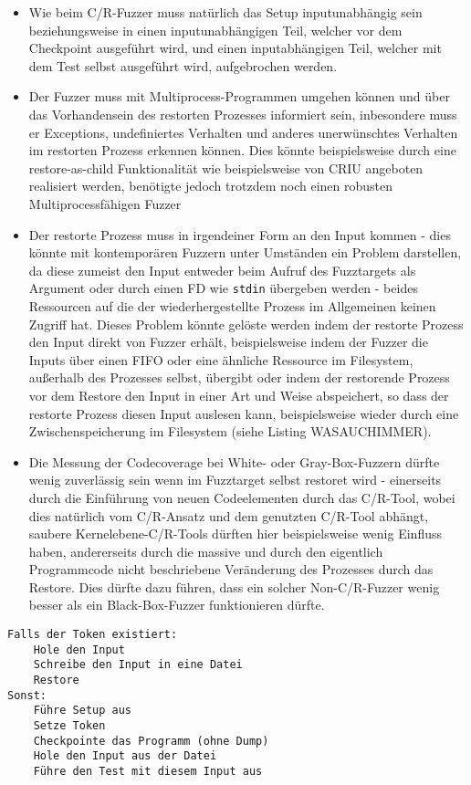 \documentclass[a4paper]{article}
\begin{document}
\begin{itemize}
    \item Wie beim C/R-Fuzzer muss natürlich das Setup inputunabhängig sein beziehungsweise in einen inputunabhängigen Teil, welcher vor dem Checkpoint ausgeführt wird, und einen inputabhängigen Teil, welcher mit dem Test selbst ausgeführt wird, aufgebrochen werden.
    \item Der Fuzzer muss mit Multiprocess-Programmen umgehen können und über das Vorhandensein des restorten Prozesses informiert sein, inbesondere muss er Exceptions, undefiniertes Verhalten und anderes unerwünschtes Verhalten im restorten Prozess erkennen können. Dies könnte beispielsweise durch eine restore-as-child Funktionalität wie beispielsweise von CRIU angeboten realisiert werden, benötigte jedoch trotzdem noch einen robusten Multiprocessfähigen Fuzzer
    \item Der restorte Prozess muss in irgendeiner Form an den Input kommen - dies könnte mit kontemporären Fuzzern unter Umständen ein Problem darstellen, da diese zumeist den Input entweder beim Aufruf des Fuzztargets als Argument oder durch einen FD wie \texttt{stdin} übergeben werden - beides Ressourcen auf die der wiederhergestellte Prozess im Allgemeinen keinen Zugriff hat. Dieses Problem könnte gelöste werden indem der restorte Prozess den Input direkt von Fuzzer erhält, beispielsweise indem der Fuzzer die Inputs über einen FIFO oder eine ähnliche Ressource im Filesystem, außerhalb des Prozesses selbst, übergibt oder indem der restorende Prozess vor dem Restore den Input in einer Art und Weise abspeichert, so dass der restorte Prozess diesen Input auslesen kann, beispielsweise wieder durch eine Zwischenspeicherung im Filesystem (siehe Listing WASAUCHIMMER).
    \item Die Messung der Codecoverage bei White- oder Gray-Box-Fuzzern dürfte wenig zuverlässig sein wenn im Fuzztarget selbst restoret wird - einerseits durch die Einführung von neuen Codeelementen durch das C/R-Tool, wobei dies natürlich vom C/R-Ansatz und dem genutzten C/R-Tool abhängt, saubere Kernelebene-C/R-Tools dürften hier beispielsweise wenig Einfluss haben, andererseits durch die massive und durch den eigentlich Programmcode nicht beschriebene Veränderung des Prozesses durch das Restore. Dies dürfte dazu führen, dass ein solcher Non-C/R-Fuzzer wenig besser als ein Black-Box-Fuzzer funktionieren dürfte.
\end{itemize}
\begin{lstlisting}[caption=Struktur C/R-Fuzztarget für Non-C/R-Fuzzer mit Inputdump]
Falls der Token existiert:
    Hole den Input
    Schreibe den Input in eine Datei
    Restore
Sonst:
    Führe Setup aus
    Setze Token
    Checkpointe das Programm (ohne Dump)
    Hole den Input aus der Datei
    Führe den Test mit diesem Input aus
\end{lstlisting}
\end{document}
